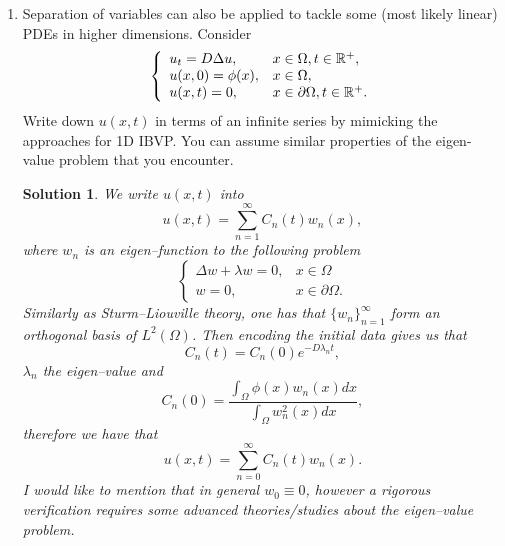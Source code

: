 \documentclass[6pt]{article}
\newtheorem{solution}{Solution}
\numberwithin{equation}{section}
\def\mathbb{\Bbb}
\begin{document}
\begin{enumerate}
\item  Separation of variables can also be applied to tackle some (most likely linear) PDEs in higher dimensions.  Consider
\begin{equation}
\left\{
\begin{array}{ll}
u_t=D\Delta u,& x\in\Omega,t\in\mathbb R^+,\\
u(x,0)=\phi(x),&x\in\Omega,\\
u(x,t)=0, &x\in\partial \Omega, t\in\mathbb R^+.
\end{array}
\right.
\end{equation}
Write down $u(x,t)$ in terms of an infinite series by mimicking the approaches for 1D IBVP.  You can assume similar properties of the eigen-value problem that you encounter.
\begin{solution}
We write $u(x,t)$ into
\[u(x,t)=\sum_{n=1}^\infty C_n(t)w_n(x),\]
where $w_n$ is an eigen--function to the following problem
\begin{equation}\label{MDEP}
\left\{
\begin{array}{ll}
\Delta w+\lambda w=0,& x\in\Omega\\
w=0, &x\in\partial \Omega.
\end{array}
\right.
\end{equation}
Similarly as Sturm--Liouville theory, one has that $\{w_n\}_{n=1}^\infty$ form an orthogonal basis of $L^2(\Omega)$.  Then encoding the initial data gives us that
\[C_n(t)=C_n(0)e^{-D\lambda_n t},\]
$\lambda_n$ the eigen--value and
\[C_n(0)=\frac{\int_\Omega \phi(x)w_n(x)dx}{\int_\Omega w^2_n(x)dx},\]
therefore we have that
\[u(x,t)=\sum_{n=0}^\infty C_n(t)w_n(x).\]  I would like to mention that in general $w_0\equiv 0$, however a rigorous verification requires some advanced theories/studies about the eigen--value problem.
\end{solution}


\end{enumerate}
\end{document}
